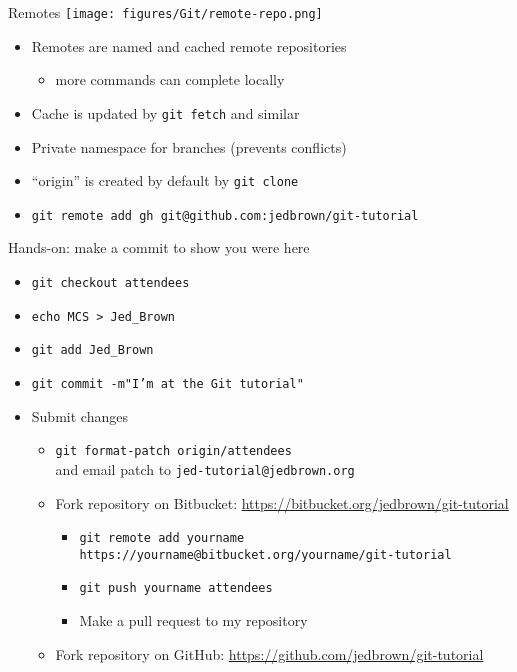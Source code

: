 \documentclass{beamer}
\begin{document}
\begin{frame}{Remotes}
  \texttt{[image: figures/Git/remote-repo.png]} \\
  \begin{itemize}
  \item Remotes are named and cached remote repositories
    \begin{itemize}
    \item more commands can complete locally
    \end{itemize}
  \item Cache is updated by \texttt{git fetch} and similar
  \item Private namespace for branches (prevents conflicts)
  \item ``origin'' is created by default by \texttt{git clone}
  \item \texttt{git remote add gh git@github.com:jedbrown/git-tutorial}
  \end{itemize}
\end{frame}

\begin{frame}{Hands-on: make a commit to show you were here}
  \begin{itemize}
  \item \texttt{git checkout attendees}
  \item \texttt{echo MCS > Jed\_Brown}
  \item \texttt{git add Jed\_Brown}
  \item \texttt{git commit -m"I'm at the Git tutorial"}
  \item Submit changes
    \begin{itemize}
    \item \texttt{git format-patch origin/attendees} \\
      \quad and email patch to \texttt{jed-tutorial@jedbrown.org}
    \item Fork repository on Bitbucket: \url{https://bitbucket.org/jedbrown/git-tutorial}
      \begin{itemize}
      \item \texttt{git remote add yourname https://yourname@bitbucket.org/yourname/git-tutorial}
      \item \texttt{git push yourname attendees}
      \item Make a pull request to my repository
      \end{itemize}
    \item Fork repository on GitHub: \url{https://github.com/jedbrown/git-tutorial}
    \end{itemize}
  \end{itemize}
\end{frame}
\end{document}
